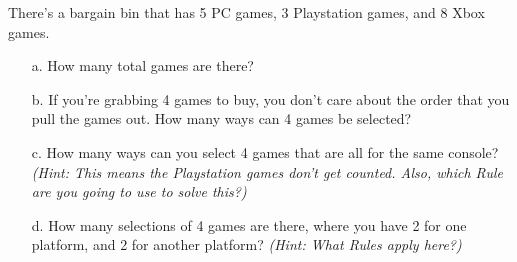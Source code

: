     \begin{questionNOGRADE}{\thequestion}
        There's a bargain bin that has 5 PC games, 3 Playstation games, and 8 Xbox games.

        \begin{enumerate}
            \item[a.]   How many total games are there?
            
            \item[b.]   If you're grabbing 4 games to buy, you don't care about the order
                        that you pull the games out. How many ways can 4 games be selected?

            \item[c.]   How many ways can you select 4 games that are all for the same console?
                        \textit{(Hint: This means the Playstation games don't get counted.
                        Also, which Rule are you going to use to solve this?)}

            \item[d.]   How many selections of 4 games are there, where you have 2 for one platform,
                        and 2 for another platform?
                        \textit{(Hint: What Rules apply here?)}
        \end{enumerate}
    \end{questionNOGRADE}
    



